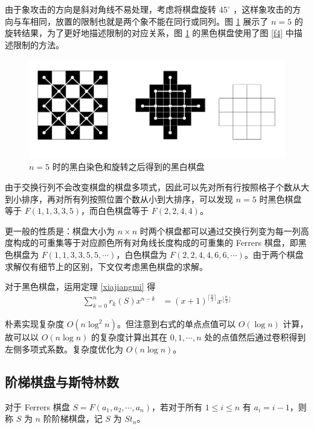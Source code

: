 \documentclass{noithesis}
\begin{document}
	由于象攻击的方向是斜对角线不易处理，考虑将棋盘旋转 $45^\circ$ ，这样象攻击的方向与车相同，放置的限制也就是两个象不能在同行或同列。图 \ref{f7} 展示了 $n=5$ 的旋转结果，为了更好地描述限制的对应关系，图 \ref{f7} 的黑色棋盘使用了图 \ref{f4} 中描述限制的方法。\begin{figure}[h]
		\centering
		\caption{$n=5$ 时的黑白染色和旋转之后得到的黑白棋盘}
		\label{f7}
		\includegraphics[scale=0.4]{picture/figure7-1.png}
	\end{figure}
	
	由于交换行列不会改变棋盘的棋盘多项式，因此可以先对所有行按照格子个数从大到小排序，再对所有列按照位置个数从小到大排序，可以发现 $n=5$ 时黑色棋盘等于 $F(1,1,3,3,5)$，而白色棋盘等于 $F(2,2,4,4)$。
	
	更一般的性质是：棋盘大小为 $n \times n$ 时两个棋盘都可以通过交换行列变为每一列高度构成的可重集等于对应颜色所有对角线长度构成的可重集的 Ferrers 棋盘，即黑色棋盘为 $F(1,1,3,3,5,5,\cdots)$，白色棋盘为 $F(2,2,4,4,6,6,\cdots)$。由于两个棋盘求解仅有细节上的区别，下文仅考虑黑色棋盘的求解。
	
	对于黑色棋盘，运用定理 \ref{xiajiangmi} 得\begin{equation}
	\begin{split}
	\sum_{k=0}^n r_k(S)x^{\underline{n-k}} &= (x+1)^{\lceil \frac{n}{2} \rceil} x^{\lfloor \frac{n}{2} \rfloor}
	\end{split}
	\end{equation}
	
	朴素实现复杂度 $O(n \log^2 n)$。但注意到右式的单点点值可以 $O(\log n)$ 计算，故可以以 $O(n \log n)$ 的复杂度计算出其在 $0,1,\cdots,n$ 处的点值然后通过卷积得到左侧多项式系数。复杂度优化为 $O(n \log n)$。
	
	\subsection{阶梯棋盘与斯特林数}
	
	\begin{definition}[阶梯棋盘]
		对于 Ferrers 棋盘 $S = F(a_1,a_2,\cdots,a_n)$，若对于所有 $1 \leq i \leq n$ 有 $a_i = i-1$，则称 $S$ 为 $n$ 阶阶梯棋盘，记 $S$ 为 $St_n$。
	\end{definition}
\end{document}
